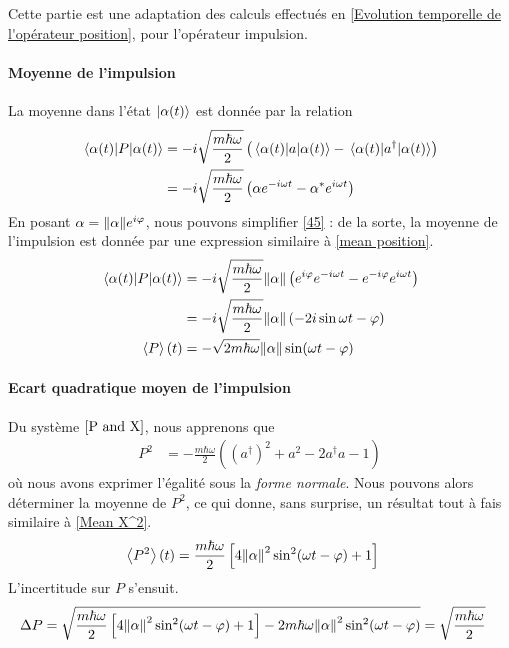 \documentclass[11pt,oneside,a4paper]{article}
\newcommand{\h}{\ensuremath{\hbar}}
\begin{document}
Cette partie est une adaptation des calculs effectués en \ref{Evolution temporelle de l'opérateur position}, pour l'opérateur impulsion.

\paragraph{Moyenne de l'impulsion}

La moyenne dans l'état $\ket{\alpha(t)}$ est donnée par la relation
\begin{align}
  \expval{P}{\alpha(t)} &= -i\sqrt{\frac{m\h\omega}{2}}\left(\expval{a}{\alpha(t)}-\expval{a^\dagger}{\alpha(t)}\right)\\
  &= -i\sqrt{\frac{m\h\omega}{2}}\left(\alpha e^{-i\omega t}-\alpha^*e^{i\omega t}\right)\label{45}
\end{align}
En posant $\alpha = \norm{\alpha}e^{i\varphi}$, nous pouvons simplifier \eqref{45} : de la sorte, la moyenne de l'impulsion est donnée par une expression similaire à \eqref{mean position}.
\begin{align}
  \expval{P}{\alpha(t)} &= -i\sqrt{\frac{m\h\omega}{2}}\norm{\alpha}\left(e^{i\varphi}e^{-i\omega t}-e^{-i\varphi}e^{i\omega t}\right)\\
  &= -i\sqrt{\frac{m\h\omega}{2}}\norm{\alpha} \left(-2i\sin\omega t-\varphi\right)\\
  \expval{P}(t) &= -\sqrt{2m\h\omega}\norm{\alpha}\sin(\omega t-\varphi) \label{mean P}
\end{align} 

\paragraph{Ecart quadratique moyen de l'impulsion}

Du système $\eqref{P and X}$, nous apprenons que 
\begin{align}
  P^2 &= -\frac{m\h\omega}{2}\left(\left(a^\dagger\right)^2+a^2-2a^\dagger a-1\right)
\end{align}
où nous avons exprimer l'égalité sous la \emph{forme normale}. Nous pouvons alors déterminer la moyenne de $P^2$, ce qui donne, sans surprise, un résultat tout à fais similaire à \eqref{Mean X^2}.
\begin{align}
  \label{Mean P^2}
  \expval{P^2}(t)&= \frac{m\h\omega}{2}\left[4\norm{\alpha}^2\sin^2(\omega t-\varphi)+1\right]
\end{align}
L'incertitude sur $P$ s'ensuit.
\begin{align}
  \Delta P &= \sqrt{\frac{m\h\omega}{2}\left[4\norm{\alpha}^2\sin^2(\omega t-\varphi)+1\right] - 2m\h\omega\norm{\alpha}^2\sin^2(\omega t-\varphi)} = \sqrt{\frac{m\h\omega}{2}}
\end{align}
\end{document}
